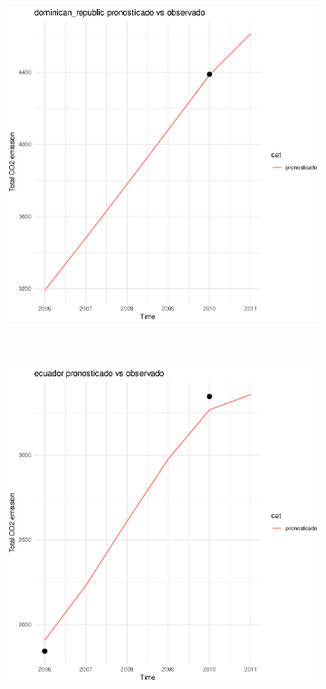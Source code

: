 \documentclass[twocolumn]{article}
\begin{document}
\begin{figure}
\begin{subfigure}{.3\textwidth}
        \end{subfigure}
        \hspace*{\fill}
        \begin{subfigure}{.3\textwidth}
            \includegraphics[width=\linewidth]{images/dominican_republic_imputation.eps}
        \end{subfigure}\\
        \begin{subfigure}{.3\textwidth}
            \includegraphics[width=\linewidth]{images/ecuador_imputation.eps}

\end{subfigure}
\end{figure}
\end{document}
